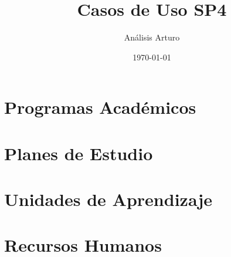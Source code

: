 \documentclass[12pt]{report}
\title{Casos de Uso SP4}
\author{Análisis Arturo}
\date{\today}
\begin{document}
\maketitle
\thispagestyle{empty}
\tableofcontents


\chapter{Programas Académicos}



\chapter{Planes de Estudio}





\chapter{Unidades de Aprendizaje}


\chapter{Recursos Humanos}




\end{document}
